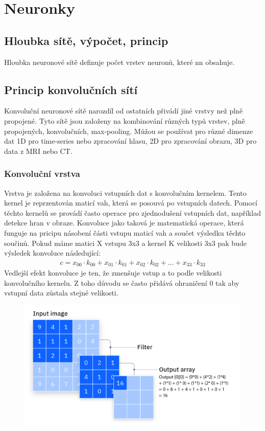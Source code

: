 \section{Neuronky}
\subsection{Hloubka sítě, výpočet, princip}

Hloubka neuronové sítě definuje počet vrstev neuronů, které nn obsahuje.

\subsection{Princip konvolučních sítí}
Konvoluční neuronové sítě narozdíl od ostatních přivádí jiné vrstvy než plně propojené. Tyto sítě jsou založeny na kombinování různých typů vrstev, plně
propojených, konvolučních, max-pooling. Můžou se používat pro různé dimenze dat 1D pro time-series nebo zpracování hlasu, 2D pro zpracování obrazu, 3D pro data z
MRI nebo CT.\\
\subsubsection{Konvoluční vrstva}
Vrstva je založena na konvoluci vstupních dat s konvolučním kernelem. Tento kernel je reprzentován maticí vah, která se posouvá po vstupních datech. Pomocí těchto
kernelů se provádí často operace pro zjednodušení vstupních dat, například detekce hran v obraze. Konvoluce jako taková je matematická operace, která funguje na 
pricipu násobení části vstupu maticí vah a součet výsledku těchto součinů. Pokud máme matici X vstupu 3x3 a kernel K velikosti 3x3 pak bude výsledek konvoluce následující:\\
\begin{align*}
    c = x_{00}\cdot k_{00} + x_{01}\cdot k_{01} + x_{02}\cdot k_{02} + ... + x_{33}\cdot k_{33}
\end{align*}
Vedlejší efekt konvoluce je ten, že zmenšuje vstup a to podle velikosti konvolučního kernelu. Z toho důvodu se často přidává ohraničení 0 tak aby vstupní data
zůstala stejné velikosti.\\
\begin{figure}[ht]
    \centering
    \includegraphics[scale = 0.25]{images/iclh-diagram-convolutional-neural-networks.png}
\end{figure}
